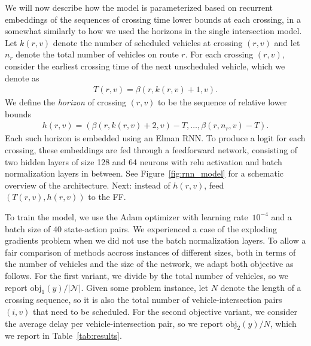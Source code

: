 \documentclass[a4paper]{article}
\theoremstyle{definition}
\theoremstyle{plain}
\begin{document}
We will now describe how the model is parameterized based on recurrent
embeddings of the sequences of crossing time lower bounds at each crossing, in a
somewhat similarly to how we used the horizons in the single intersection model.
%
Let $k(r, v)$ denote the number of scheduled vehicles at crossing $(r, v)$ and
let $n_{r}$ denote the total number of vehicles on route $r$. For each crossing
$(r, v)$, consider the earliest crossing time of the next unscheduled vehicle,
which we denote as
\begin{align*}
  T(r, v) = \beta(r, k(r, v) + 1, v) .
\end{align*}
We define the \textit{horizon} of crossing $(r, v)$ to be the sequence of relative lower bounds
\begin{align*}
  h(r, v) = (\beta(r, k(r, v) + 2, v) - T, \dots, \beta(r, n_{r}, v) - T) .
\end{align*}
%
Each such horizon is embedded using an Elman RNN. To produce a logit for each
crossing, these embeddings are fed through a feedforward network, consisting of
two hidden layers of size 128 and 64 neurons with relu activation and batch
normalization layers in between. See Figure~\ref{fig:rnn_model} for a schematic
overview of the architecture. {\color{Navy} Next: instead of $h(r, v)$, feed
  $(T(r, v), h(r, v))$ to the FF.}


To train the model, we use the Adam optimizer with learning rate~$10^{-4}$ and a
batch size of $40$ state-action pairs. We experienced a case of the exploding
gradients problem when we did not use the batch normalization layers. To allow a fair comparison of methods accross instances of different
sizes, both in terms of the number of vehicles and the size of the network, we
adapt both objective as follows.
For the first variant, we divide by the total number of vehicles, so we report
$\text{obj}_{1}(y) / |\mathcal{N}|$. Given some problem instance, let $N$ denote
the length of a crossing sequence, so it is also the total number of
vehicle-intersection pairs $(i, v)$ that need to be scheduled. For the second
objective variant, we consider the average delay per vehicle-intersection pair,
so we report $\text{obj}_{2}(y) / N$, which we report in Table~\ref{tab:results}.
\end{document}

